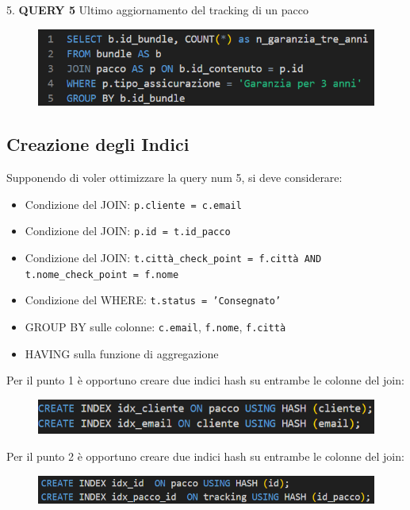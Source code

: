 5. \textbf{QUERY 5} Ultimo aggiornamento del tracking di un pacco
\begin{figure}[H]
\centering
\includegraphics[width=1 \textwidth]{Resources/QUERY2.png}
\label{ML}
\end{figure}

\subsection{Creazione degli Indici} 

Supponendo di voler ottimizzare la query num 5, si deve considerare:

\begin{itemize}
  \item Condizione del JOIN: \texttt{p.cliente = c.email}
  \item Condizione del JOIN: \texttt{p.id = t.id\_pacco}
  \item Condizione del JOIN: \texttt{t.città\_check\_point = f.città AND t.nome\_check\_point = f.nome}
  \item Condizione del WHERE: \texttt{t.status = 'Consegnato'}
  \item GROUP BY sulle colonne: \texttt{c.email}, \texttt{f.nome}, \texttt{f.città}
  \item HAVING sulla funzione di aggregazione 
\end{itemize}


\noindent Per il punto 1 è opportuno creare due indici hash su entrambe le colonne del join:
\begin{figure}[H]
\centering
\includegraphics[width=1 \textwidth]{Resources/INDEX1.png}
\label{ML}
\end{figure}

\noindent Per il punto 2 è opportuno creare due indici hash su entrambe le colonne del join:
\begin{figure}[H]
\centering
\includegraphics[width=1 \textwidth]{Resources/INDEX2.png}
\label{ML}
\end{figure}

